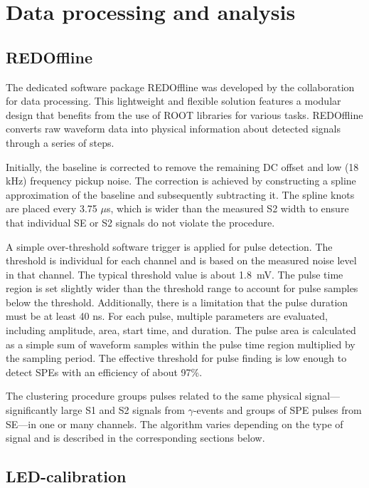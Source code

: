 \documentclass[a4paper,11pt]{article}
\begin{document}
\section{Data processing and analysis}
\label{sec:processing}
\subsection{REDOffline}
\label{sec:RED offline}
The dedicated software package REDOffline was developed by the collaboration for data processing. This lightweight and flexible solution features a modular design that benefits from the use of ROOT libraries \cite{BRUN199781} for various tasks. REDOffline converts raw waveform data into physical information about detected signals through a series of steps.

Initially, the baseline is corrected to remove the remaining DC offset and low (18 kHz) frequency pickup noise. The correction is achieved by constructing a spline approximation of the baseline and subsequently subtracting it. The spline knots are placed every 3.75 $\mu$s, which is wider than the measured S2 width to ensure that individual SE or S2 signals do not violate the procedure.

   A simple over-threshold software trigger is applied for pulse detection. The threshold is individual for each channel and is based on the measured noise level in that channel. The typical threshold value is about 1.8~mV. The pulse time region is set slightly wider than the threshold range to account for pulse samples below the threshold. Additionally, there is a limitation that the pulse duration must be at least 40 ns. For each pulse, multiple parameters are evaluated, including amplitude, area, start time, and duration. The pulse area is calculated as a simple sum of waveform samples within the pulse time region multiplied by the sampling period. The effective threshold for pulse finding is low enough to detect SPEs with an efficiency of about 97\%.
   
The clustering procedure groups pulses related to the same physical signal---significantly large S1 and S2 signals from $\gamma$-events and groups of SPE pulses from SE---in one or many channels. The algorithm varies depending on the type of signal and is described in the corresponding sections below.

\subsection{LED-calibration}
\label{subsec:LED}
\end{document}
